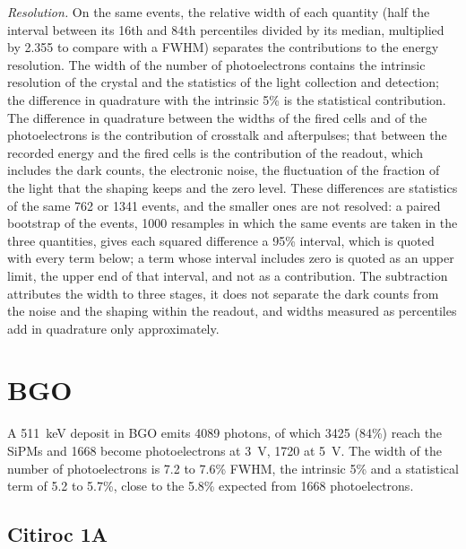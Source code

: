 \documentclass[11pt]{article}
\begin{document}
\emph{Resolution.} On the same events, the relative width of each quantity
(half the interval between its 16th and 84th percentiles divided by its
median, multiplied by 2.355 to compare with a FWHM) separates the
contributions to the energy resolution. The width of the number of
photoelectrons contains the intrinsic resolution of the crystal and the
statistics of the light collection and detection; the difference in
quadrature with the intrinsic 5\% is the statistical contribution. The
difference in quadrature between the widths of the fired cells and of the
photoelectrons is the contribution of crosstalk and afterpulses; that
between the recorded energy and the fired cells is the contribution of the
readout, which includes the dark counts, the electronic noise, the
fluctuation of the fraction of the light that the shaping keeps and the
zero level. These differences are statistics of the same 762 or 1341
events, and the smaller ones are not resolved: a paired bootstrap of the
events, 1000 resamples in which the same events are taken in the three
quantities, gives each squared difference a 95\% interval, which is
quoted with every term below; a term whose interval includes zero is
quoted as an upper limit, the upper end of that interval, and not as a
contribution. The subtraction attributes the width to three stages, it
does not separate the dark counts from the noise and the shaping within
the readout, and widths measured as percentiles add in quadrature only
approximately.

\section{BGO}
\label{sec:bgo}

A 511~keV deposit in BGO emits 4089 photons, of which 3425 (84\%) reach the
SiPMs and 1668 become photoelectrons at 3~V, 1720 at 5~V. The width of the
number of photoelectrons is 7.2 to 7.6\% FWHM, the intrinsic 5\% and a
statistical term of 5.2 to 5.7\%, close to the 5.8\% expected from 1668
photoelectrons.

\subsection{Citiroc 1A}
\end{document}
